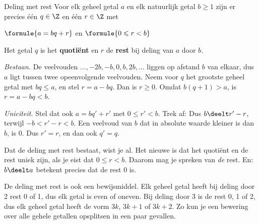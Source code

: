 \begin{theorie}
\begin{stelling}{Deling met rest}
Voor elk geheel getal $a$ en elk natuurlijk getal $b \geqslant 1$ zijn er precies één $q \in \Z$ en één $r \in \Z$ met

\vspace{1mm}
\qquad $\formule{a = bq + r}$ \qquad en \qquad $\formule{0 \leqslant r < b}$
\end{stelling}
Het getal $q$ is het \textbf{\textcolor{accent}{quotiënt}} en $r$ de \textbf{\textcolor{accent}{rest}} bij deling van $a$ door $b$.

\begin{bewijs}
\textit{Bestaan.} De veelvouden $\ldots, -2b, -b, 0, b, 2b, \ldots$ liggen op afstand $b$ van elkaar, dus $a$ ligt tussen twee opeenvolgende veelvouden. Neem voor $q$ het grootste geheel getal met $bq \leqslant a$, en stel $r = a - bq$. Dan is $r \geqslant 0$. Omdat $b(q + 1) > a$, is $r = a - bq < b$.

\textit{Uniciteit.} Stel dat ook $a = bq' + r'$ met $0 \leqslant r' < b$. Trek af:
Dus $b \deelt r' - r$, terwijl $-b < r' - r < b$. Een veelvoud van $b$ dat in absolute waarde kleiner is dan $b$, is 0. Dus $r' = r$, en dan ook $q' = q$.
\end{bewijs}
\end{theorie}

Dat de deling met rest bestaat, wist je al. Het nieuwe is dat het quotiënt en de rest uniek zijn, als je eist dat $0 \leqslant r < b$. Daarom mag je spreken van \textit{de} rest. En: $b \deelt a$ betekent precies dat de rest 0 is.


De deling met rest is ook een bewijsmiddel. Elk geheel getal heeft bij deling door 2 rest 0 of 1, dus elk getal is even of oneven. Bij deling door 3 is de rest 0, 1 of 2, dus elk geheel getal heeft de vorm $3k$, $3k + 1$ of $3k + 2$. Zo kun je een bewering over alle gehele getallen opsplitsen in een paar gevallen.

